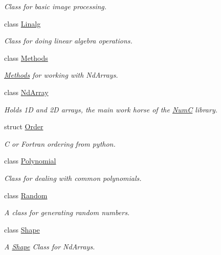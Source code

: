 \begin{DoxyCompactItemize}
\begin{DoxyCompactList}\small\item\em Class for basic image processing. \end{DoxyCompactList}\item 
class \mbox{\hyperlink{class_num_c_1_1_linalg}{Linalg}}
\begin{DoxyCompactList}\small\item\em Class for doing linear algebra operations. \end{DoxyCompactList}\item 
class \mbox{\hyperlink{class_num_c_1_1_methods}{Methods}}
\begin{DoxyCompactList}\small\item\em \mbox{\hyperlink{class_num_c_1_1_methods}{Methods}} for working with Nd\+Arrays. \end{DoxyCompactList}\item 
class \mbox{\hyperlink{class_num_c_1_1_nd_array}{Nd\+Array}}
\begin{DoxyCompactList}\small\item\em Holds 1D and 2D arrays, the main work horse of the \mbox{\hyperlink{namespace_num_c}{NumC}} library. \end{DoxyCompactList}\item 
struct \mbox{\hyperlink{struct_num_c_1_1_order}{Order}}
\begin{DoxyCompactList}\small\item\em C or Fortran ordering from python. \end{DoxyCompactList}\item 
class \mbox{\hyperlink{class_num_c_1_1_polynomial}{Polynomial}}
\begin{DoxyCompactList}\small\item\em Class for dealing with common polynomials. \end{DoxyCompactList}\item 
class \mbox{\hyperlink{class_num_c_1_1_random}{Random}}
\begin{DoxyCompactList}\small\item\em A class for generating random numbers. \end{DoxyCompactList}\item 
class \mbox{\hyperlink{class_num_c_1_1_shape}{Shape}}
\begin{DoxyCompactList}\small\item\em A \mbox{\hyperlink{class_num_c_1_1_shape}{Shape}} Class for Nd\+Arrays. \end{DoxyCompactList}\item 

\end{DoxyCompactItemize}
